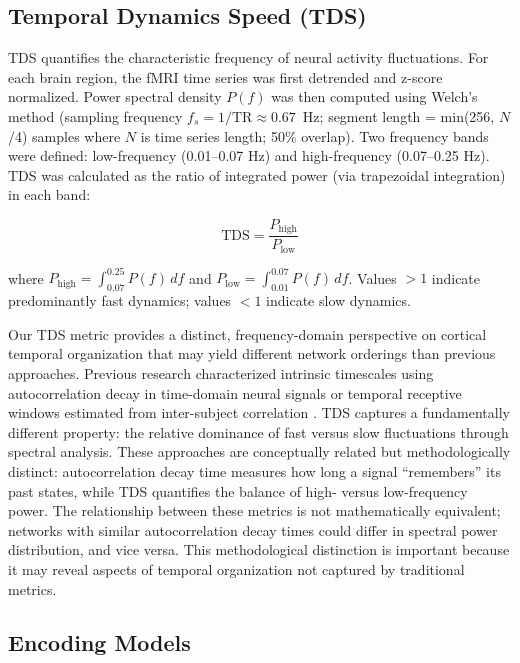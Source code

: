 \documentclass[10pt,letterpaper]{article}
\begin{document}
\subsection{Temporal Dynamics Speed (TDS)}

TDS quantifies the characteristic frequency of neural activity fluctuations. For each brain region, the fMRI time series was first detrended and z-score normalized. Power spectral density $P(f)$ was then computed using Welch's method (sampling frequency $f_s = 1/\text{TR} \approx 0.67$~Hz; segment length = min(256, $N$/4) samples where $N$ is time series length; 50\% overlap). Two frequency bands were defined: low-frequency (0.01--0.07 Hz) and high-frequency (0.07--0.25 Hz). TDS was calculated as the ratio of integrated power (via trapezoidal integration) in each band:

\begin{equation}
\text{TDS} = \frac{P_{\text{high}}}{P_{\text{low}}}
\end{equation}

\noindent where $P_{\text{high}} = \int_{0.07}^{0.25} P(f) \, df$ and $P_{\text{low}} = \int_{0.01}^{0.07} P(f) \, df$. Values $>1$ indicate predominantly fast dynamics; values $<1$ indicate slow dynamics.

Our TDS metric provides a distinct, frequency-domain perspective on cortical temporal organization that may yield different network orderings than previous approaches. Previous research characterized intrinsic timescales using autocorrelation decay in time-domain neural signals \citep{murray2014hierarchy} or temporal receptive windows estimated from inter-subject correlation \citep{hasson2008hierarchy}. TDS captures a fundamentally different property: the relative dominance of fast versus slow fluctuations through spectral analysis. These approaches are conceptually related but methodologically distinct: autocorrelation decay time measures how long a signal ``remembers'' its past states, while TDS quantifies the balance of high- versus low-frequency power. The relationship between these metrics is not mathematically equivalent; networks with similar autocorrelation decay times could differ in spectral power distribution, and vice versa. This methodological distinction is important because it may reveal aspects of temporal organization not captured by traditional metrics.

\subsection{Encoding Models}
\end{document}
